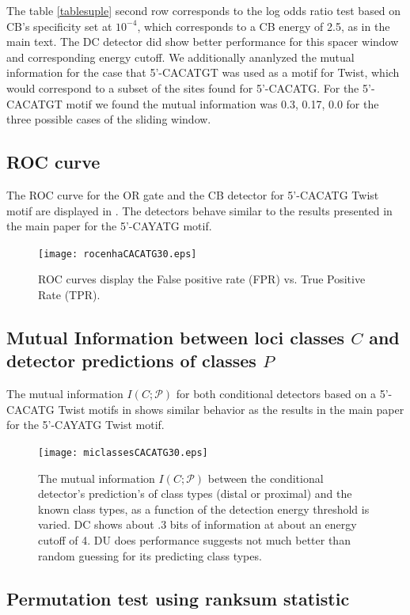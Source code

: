 The  table \ref{tablesuple} second row corresponds to the log odds ratio test based on CB's specificity set at $10^{-4}$, which corresponds to a CB energy of 2.5, as in the main text.  The DC detector did show better performance for this spacer window and corresponding energy cutoff.  We additionally ananlyzed the mutual information for the case that 5'-CACATGT was used as a motif for Twist, which would correspond to a subset of the sites found for 5'-CACATG.  For the 5'-CACATGT motif we found the mutual information was 0.3, 0.17, 0.0 for the three possible cases of the sliding window.

\newpage

\subsection{ROC curve}
 The ROC curve for the OR gate and the CB detector for 5'-CACATG Twist motif are displayed in .  The detectors behave similar to the results presented in the main paper for the 5'-CAYATG motif.
\begin{figure}[!htbp]
\texttt{[image: rocenhaCACATG30.eps]}
\caption{ROC curves display the False positive rate (FPR) vs. True Positive Rate (TPR).  }
\end{figure}\label{rocfig2sup}


\newpage

\subsection{Mutual Information between loci classes $C$ and detector predictions of classes $P$}
The mutual information $I(C;\mathcal P)$ for both conditional detectors based on a 5'-CACATG Twist motifs in  shows similar behavior as the results in the main paper for the 5'-CAYATG Twist motif.   
\begin{figure}[!htbp]
\texttt{[image: miclassesCACATG30.eps]}
\caption{The mutual information $I(C;\mathcal P)$ between the conditional detector's prediction's of class types (distal or proximal) and the known class types, as a function of the detection energy threshold is varied.  DC shows about .3 bits of information at about an energy cutoff of 4.  DU does performance suggests not much better than random guessing for its predicting class types.  }
\end{figure}\label{miCPsup}

\newpage
\subsection{Permutation test using ranksum statistic } 

